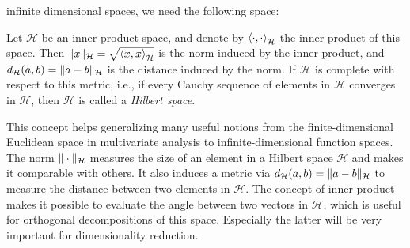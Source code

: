 infinite dimensional spaces, we need the following space:
\begin{definition}
    \label{def:hilbert space}
    Let $\mathcal{H}$ be an inner product space, and denote by $\left \langle \cdot, \cdot \right \rangle_\mathcal{H}$
    the inner product of this space. Then $\|x\|_\mathcal{H} = \sqrt{\left \langle x, x \right \rangle_\mathcal{H}}$
    is the norm induced by the inner product, and $d_\mathcal{H}(a, b) = \|a - b\|_\mathcal{H}$
    is the distance induced by the norm. If $\mathcal{H}$ is complete with respect
    to this metric, i.e., if every Cauchy sequence of elements in $\mathcal{H}$ converges
    in $\mathcal{H}$, then $\mathcal{H}$ is called a \textit{Hilbert space}.
\end{definition}
This concept helps generalizing many useful notions from the finite-dimensional
Euclidean space in multivariate analysis to infinite-dimensional function spaces. The norm
$\|\cdot\|_\mathcal{H}$ measures the size of an element in a Hilbert space $\mathcal{H}$ and makes it
comparable with others. It also induces a metric via
$d_\mathcal{H}(a, b) = \|a - b\|_\mathcal{H}$ to measure the distance between two
elements in $\mathcal{H}$. The concept of inner product makes it possible to evaluate
the angle between two vectors in $\mathcal{H}$, which is useful for orthogonal
decompositions of this space. Especially the latter will be very important for dimensionality reduction.

